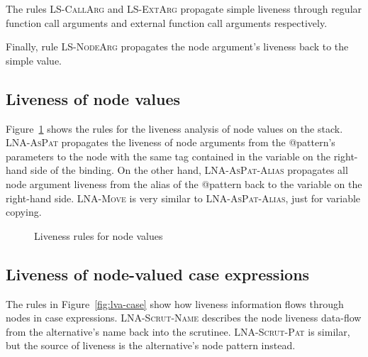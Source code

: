 \documentclass[main.tex]{subfiles}
\begin{document}
	The rules \textsc{LS-CallArg} and \textsc{LS-ExtArg} propagate simple liveness through regular function call arguments and external function call arguments respectively.
	
	Finally, rule \textsc{LS-NodeArg} propagates the node argument's liveness back to the simple value.
	
	\subsection{Liveness of node values}
	
	Figure~\ref{fig:lva-nodes} shows the rules for the liveness analysis of node values on the stack. \textsc{LNA-AsPat} propagates the liveness of node arguments from the @pattern's parameters to the node with the same tag contained in the variable on the right-hand side of the binding. On the other hand, \textsc{LNA-AsPat-Alias} propagates all node argument liveness from the alias of the @pattern back to the variable on the right-hand side. \textsc{LNA-Move} is very similar to \textsc{LNA-AsPat-Alias}, just for variable copying.

  \begin{figure}[h]
  \caption{Liveness rules for node values}
  \label{fig:lva-nodes}
  \end{figure}

	\subsection{Liveness of node-valued case expressions}
	
	The rules in Figure~\ref{fig:lva-case} show how liveness information flows through nodes in case expressions. \textsc{LNA-Scrut-Name} describes the node liveness data-flow from the alternative's name back into the scrutinee. \textsc{LNA-Scrut-Pat} is similar, but the source of liveness is the alternative's node pattern instead.
	
\end{document}
